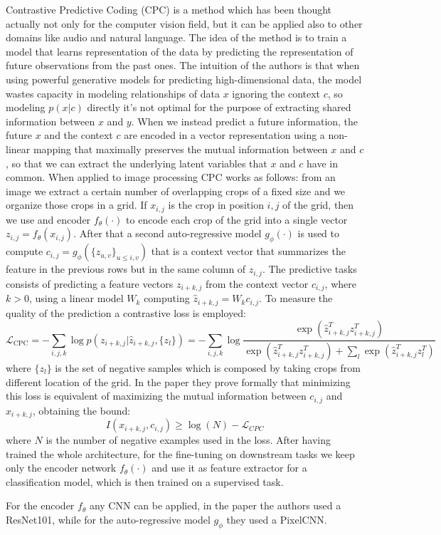 Contrastive Predictive Coding (CPC) \cite{oord2018representation} is a method which has been thought actually not only for the computer vision field, but it can be applied also to other domains like audio and natural language. The idea of the method is to train a model that learns representation of the data by predicting the representation of future observations from the past ones. The intuition of the authors is that when using powerful generative models for predicting high-dimensional data, the model wastes capacity in modeling relationships of data $x$ ignoring the context $c$, so modeling $p(x|c)$ directly it's not optimal for the purpose of extracting shared information between $x$ and $y$. When we instead predict a future information, the future $x$ and the context $c$ are encoded in a vector representation using a non-linear mapping that  maximally preserves the mutual information between $x$ and $c$, so that we can extract the underlying latent variables that $x$ and $c$ have in common. When applied to image processing CPC works as follows: from an image we extract a certain number of overlapping crops of a fixed size and we organize those crops in a grid. If $x_{i,j}$ is the crop in position $i, j$ of the grid, then we use and encoder $f_\theta(\cdot)$ to encode each crop of the grid into a single vector $z_{i,j} = f_\theta(x_{i,j})$. After that a second auto-regressive model $g_\phi(\cdot)$ is used to compute $c_{i,j} = g_\phi(\{z_{u,v}\}_{u\le i, v})$ that is a context vector that summarizes the feature in the previous rows but in the same column of $z_{i,j}$. The predictive tasks consists of predicting a feature vectors $z_{i+k,j}$ from the context vector $c_{i,j}$, where $k > 0$, using a linear model $W_k$ computing $\hat{z}_{i+k,j} = W_kc_{i,j}$. To measure the quality of the prediction a contrastive loss is employed:
\[ \mathcal{L}_{\text{CPC}} = -\sum_{i,j,k}\log p(z_{i+k,j}|\hat{z}_{i+k,j}, \{z_l\}) = -\sum_{i,j,k}\log \frac{\exp(\hat{z}^T_{i+k,j}z^T_{i+k,j})}{\exp(\hat{z}^T_{i+k,j}z^T_{i+k,j}) + \sum_l \exp(\hat{z}^T_{i+k,j}z^T_l)}\]
where $\{z_l\}$ is the set of negative samples which is composed by taking crops from different location of the grid. In the paper they prove formally that minimizing this loss is equivalent of maximizing the mutual information between $c_{i,j}$ and $x_{i+k,j}$, obtaining the bound:
\[ I(x_{i+k,j}, c_{i,j}) \ge \log(N) - \mathcal{L}_{CPC}\]
where $N$ is the number of negative examples used in the loss. After having trained the whole architecture, for the fine-tuning on downstream tasks we keep only the encoder network $f_\theta(\cdot)$ and use it as feature extractor for a classification model, which is then trained on a supervised task.

For the encoder $f_\theta$ any CNN can be applied, in the paper the authors used a ResNet101, while for the auto-regressive model $g_\phi$ they used a PixelCNN.